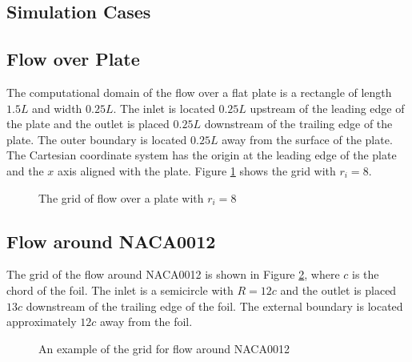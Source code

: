 \documentclass{cfdsc}
\begin{document}
\begin{multicols}{2}
\section{Simulation Cases}
\subsection{Flow over Plate}
The computational domain of the flow over a flat plate is a rectangle of length $1.5L$ and width $0.25L$. The inlet is located $0.25L$ upstream of the leading edge of the plate and the outlet is placed $0.25L$ downstream of the trailing edge of the plate. The outer boundary is located $0.25L$ away from the surface of the plate. The Cartesian coordinate system has the origin at the leading edge of the plate and the $x$ axis aligned with the plate. Figure \ref{fig:sketch_of_plate} shows the grid with $r_i=8$.
\begin{figure}[H]
\vspace{-0.1cm}   
\setlength{\belowcaptionskip}{-0.5cm} 
\caption{The grid of flow over a plate with $r_i=8$}
\label{fig:sketch_of_plate}
\end{figure}

\subsection{Flow around NACA0012}
The grid of the flow around NACA0012 is shown in Figure \ref{fig:sketch_of_NACA0012}, where $c$ is the chord of the foil. The inlet is a semicircle with $R=12c$ and the outlet is placed $13c$ downstream of the trailing edge of the foil. The external boundary is located approximately $12c$ away from the foil.
\begin{figure}[H]
\vspace{-0.1cm}   
\setlength{\belowcaptionskip}{-0.5cm}
\caption{An example of the grid for flow around NACA0012}
\label{fig:sketch_of_NACA0012}
\end{figure}


\end{multicols}
\end{document}
